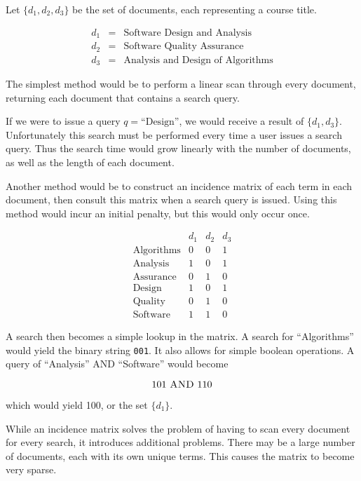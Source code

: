 	\begin{ex}
		Let $\{d_1, d_2, d_3\}$ be the set of documents, each representing a course title.
		
		\begin{eqnarray*}
			d_1 &=& \textrm{Software Design and Analysis} \\
			d_2 &=& \textrm{Software Quality Assurance} \\
			d_3 &=& \textrm{Analysis and Design of Algorithms}
		\end{eqnarray*}
		
		The simplest method would be to perform a linear scan through every document, returning each document that contains a search query.
		
		If we were to issue a query $q = \textrm{``Design''}$, we would receive a result of $\{d_1, d_3\}$.  Unfortunately this search must be performed every time a user issues a search query.  Thus the search time would grow linearly with the number of documents, as well as the length of each document.
		
		Another method would be to construct an incidence matrix of each term in each document, then consult this matrix when a search query is issued.  Using this method would incur an initial penalty, but this would only occur once.
		
		$$
			\begin{array}{lccc}
				& d_1 & d_2 & d_3 \\
				\textrm{Algorithms} & 0 & 0 & 1 \\
				\textrm{Analysis} & 1 & 0 & 1 \\
				\textrm{Assurance} & 0 & 1 & 0 \\
				\textrm{Design} & 1 & 0 & 1 \\
				\textrm{Quality} & 0 & 1 & 0 \\
				\textrm{Software} & 1 & 1 & 0
			\end{array}
		$$
		
		A search then becomes a simple lookup in the matrix.  A search for ``Algorithms'' would yield the binary string \texttt{001}.  It also allows for simple boolean operations.  A query of ``Analysis'' \textsc{AND} ``Software'' would become
		
		$$101~\textsc{AND}~110$$
		
		which would yield 100, or the set $\{d_1\}$.
		
		While an incidence matrix solves the problem of having to scan every document for every search, it introduces additional problems.  There may be a large number of documents, each with its own unique terms.  This causes the matrix to become very sparse.
		

\end{ex}

